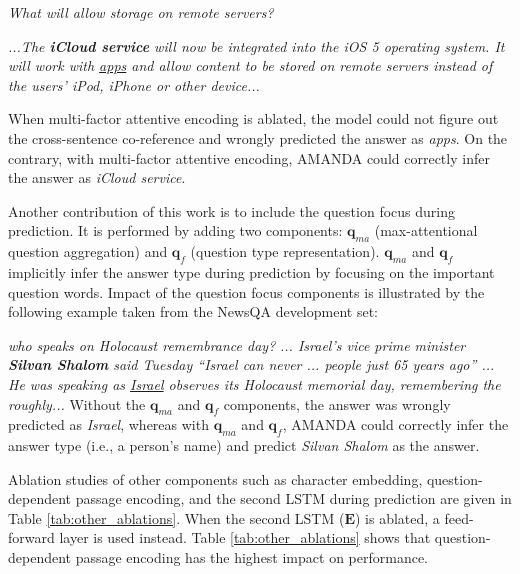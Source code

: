\documentclass[letterpaper]{article}
\begin{document}
\noindent
\textit{
What will allow storage on remote servers?
}

\noindent
\textit{
...The \textbf{iCloud service} will now be integrated into the iOS 5 operating system. It will work with \underline{apps} and allow content to be stored on remote servers instead of the users' iPod, iPhone or other device...
}

\noindent
When multi-factor attentive encoding is ablated, the model could not figure out the cross-sentence co-reference and wrongly predicted the answer as {\em apps}. On the contrary, with multi-factor attentive encoding, AMANDA could correctly infer the answer as {\em iCloud service}.

Another contribution of this work is to include the question focus during prediction. It is performed by adding two components: $\mathbf{q}_{ma}$ (max-attentional question aggregation) and $\mathbf{q}_f$ (question type representation). $\mathbf{q}_{ma}$ and $\mathbf{q}_f$ implicitly infer the answer type during prediction by focusing on the important question words.
Impact of the question focus components is illustrated by the following example taken from the NewsQA development set:

\noindent
\textit{
who speaks on Holocaust remembrance day?
}
\newline
\textit{
... Israel's vice prime minister \textbf{Silvan Shalom} said Tuesday ``Israel can never ... people just 65 years ago'' ... He was speaking as \underline{Israel} observes its Holocaust memorial day, remembering the roughly...
} \newline
Without the $\mathbf{q}_{ma}$ and $\mathbf{q}_f$ components, the answer was wrongly predicted as {\em Israel}, whereas with $\mathbf{q}_{ma}$ and $\mathbf{q}_{f}$, AMANDA could correctly infer the answer type (i.e., a person's name) and predict {\em Silvan Shalom} as the answer.

Ablation studies of other components such as character embedding, question-dependent passage encoding, and the second LSTM during prediction are given in Table \ref{tab:other_ablations}. When the second LSTM ($\mathbf{E}$) is ablated, a feed-forward layer is used instead. Table \ref{tab:other_ablations} shows that question-dependent passage encoding has the highest impact on performance.
\end{document}
